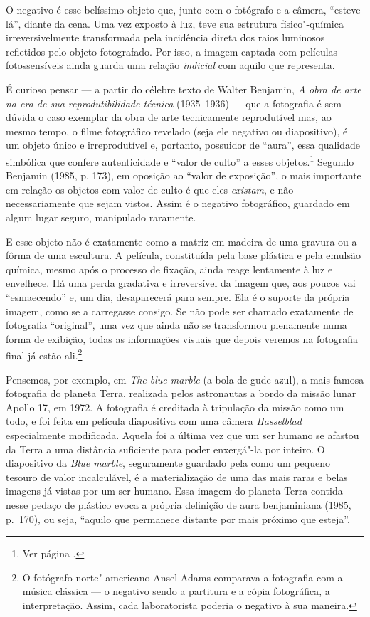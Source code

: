 O negativo é esse belíssimo objeto que, junto com o fotógrafo e a
câmera, ``esteve lá'', diante da cena. Uma vez exposto à luz, teve sua
estrutura físico"-química irreversivelmente transformada pela incidência
direta dos raios luminosos refletidos pelo objeto fotografado. Por isso,
a imagem captada com películas fotossensíveis ainda guarda uma relação
\emph{indicial} com aquilo que representa.

É curioso pensar --- a partir do célebre texto de Walter Benjamin,
\emph{A obra de arte na era de sua reprodutibilidade técnica} (1935--1936)
--- que a fotografia é sem dúvida o caso exemplar da obra de arte
tecnicamente reprodutível mas, ao mesmo tempo, o filme fotográfico
revelado (seja ele negativo ou diapositivo), é um objeto único e
irreprodutível e, portanto, possuidor de ``aura'', essa qualidade
simbólica que confere autenticidade e ``valor de culto'' a esses
objetos.\footnote{Ver página \pageref{benjamin}.} Segundo Benjamin
(1985, p. 173), em oposição ao ``valor de exposição'', o mais importante
em relação os objetos com valor de culto é que eles \emph{existam}, e
não necessariamente que sejam vistos. Assim é o negativo fotográfico,
guardado em algum lugar seguro, manipulado raramente.

E esse objeto não é exatamente como a matriz em madeira de uma gravura
ou a fôrma de uma escultura. A película, constituída pela base plástica
e pela emulsão química, mesmo após o processo de fixação, ainda reage
lentamente à luz e envelhece. Há uma perda gradativa e irreversível da
imagem que, aos poucos vai ``esmaecendo'' e, um dia, desaparecerá para
sempre. Ela é o suporte da própria imagem, como se a carregasse consigo.
Se não pode ser chamado exatamente de fotografia ``original'', uma vez
que ainda não se transformou plenamente numa forma de exibição, todas as
informações visuais que depois veremos na fotografia final já estão
ali.\footnote{O fotógrafo norte"-americano Ansel Adams comparava a
  fotografia com a música clássica --- o negativo sendo a partitura e a
  cópia fotográfica, a interpretação. Assim, cada laboratorista poderia
  {} o negativo à sua maneira.}

Pensemos, por exemplo, em \emph{The blue marble} (a bola de gude azul), \label{marble}
a mais famosa fotografia do planeta Terra, realizada pelos astronautas a
bordo da missão lunar Apollo 17, em 1972. A fotografia é creditada à
tripulação da missão como um todo, e foi feita em película diapositiva
com uma câmera \emph{Hasselblad} especialmente modificada. Aquela foi a
última vez que um ser humano se afastou da Terra a uma distância
suficiente para poder enxergá"-la por inteiro. O diapositivo da \emph{Blue marble}, seguramente guardado pela  como um pequeno tesouro de valor incalculável, é a materialização de uma das mais raras e belas imagens já vistas por um ser humano. Essa imagem do planeta Terra contida nesse pedaço de plástico evoca a própria definição de aura benjaminiana (1985, p.~170), ou seja, ``aquilo que permanece distante por mais próximo que esteja''.

